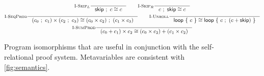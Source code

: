 \documentclass[p.tex]{subfiles}
\begin{document}
\begin{figure}
\begin{spreadlines}{5pt}
\begin{gather*}
  \inference[$\textsc{I-Skip}_L$]{%
  }{%
    \cseq{\cskip}{c} \cong c
  }
  \qquad
  \inference[$\textsc{I-Skip}_R$]{%
  }{%
    \cseq{c}{\cskip} \cong c
  }
  \\
  \inference[\textsc{I-SeqProd}]{%
  }{%
    \cprod{(\cseq{c_0}{c_1})}{(\cseq{c_2}{c_3})} \cong
    \cseq{(\cprod{c_0}{c_2})}{(\cprod{c_1}{c_3})}
  }
  \qquad
  \inference[\textsc{I-Unroll}]{%
  }{%
    \cloop{c} \cong \cloop{\cseq{c}{(\csum{c}{\cskip})}}
  }
  \\
  \inference[\textsc{I-SumProd}]{%
  }{%
    \cprod{(\csum{c_0}{c_1})}{c_2} \cong
    \csum{(\cprod{c_0}{c_2})}{(\cprod{c_1}{c_2})}
  }
\end{gather*}
\end{spreadlines}
\caption{%
  Program isomorphisms that are useful in conjunction with the
  self-relational proof system. Metavariables are consistent with
  \cref{fig:semantics}.
}
\end{figure}
\end{document}
